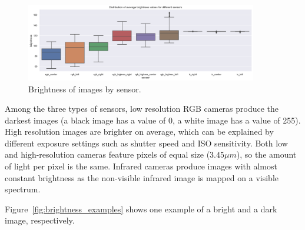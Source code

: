 \documentclass[Master,MDS,english]{BASE/twbook} %
\begin{document}
\begin{figure}[H]
\centering
\includegraphics[width=0.9\textwidth]{images/datasets/db/brightness}
\caption{Brightness of images by sensor. }
\label{fig:brightness}
\end{figure}


Among the three types of sensors, low resolution RGB cameras produce the darkest images (a black image has a value of 0, a white image has a value of 255). 
High resolution images are brighter on average, which can be explained by different exposure settings such as shutter speed and ISO sensitivity. Both low and high-resolution cameras feature pixels of equal size ($3.45 \mu m$), so the amount of light per pixel is the same.
Infrared cameras produce images with almost constant brightness as the non-visible infrared image is mapped on a visible spectrum.

Figure~\ref{fig:brightness_examples} shows one example of a bright and a dark image, respectively.
\end{document}
